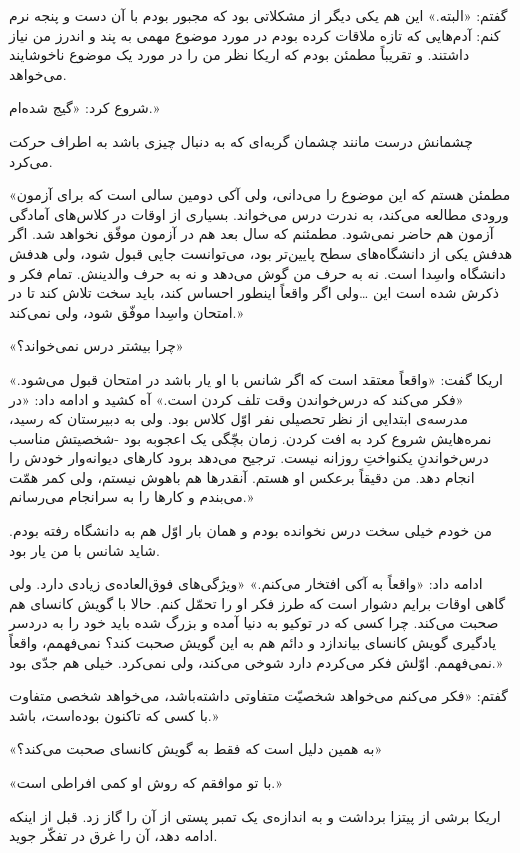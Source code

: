 \documentclass[a5paper]{book}
\begin{document}
گفتم: «البته.» این هم یکی دیگر از مشکلاتی بود که مجبور بودم با آن دست و پنجه نرم کنم: آدم‌هایی که تازه ملاقات کرده بودم در مورد موضوع مهمی به پند و اندرز من نیاز داشتند. و تقریباً مطمئن بودم که اریکا نظر من را در مورد یک موضوع ناخوشایند می‌خواهد.

شروع کرد: «گیج شده‌ام.»

چشمانش درست مانند چشمان گربه‌ای که به دنبال چیزی باشد به اطراف حرکت می‌کرد.

«مطمئن هستم که این موضوع را می‌دانی، ولی آکی دومین سالی است که برای آزمون ورودی مطالعه می‌کند، به ندرت درس می‌خواند. بسیاری از اوقات در کلاس‌های آمادگی آزمون هم حاضر نمی‌شود. مطمئنم که سال بعد هم در آزمون موفّق نخواهد شد. اگر هدفش یکی از دانشگاه‌های سطح پایین‌تر بود، می‌توانست جایی قبول شود، ولی هدفش دانشگاه واسِدا است. نه به حرف من گوش می‌دهد و نه به حرف والدینش. تمام فکر و ذکرش شده است این \ldots ولی اگر واقعاً اینطور احساس کند، باید سخت تلاش کند تا در امتحان واسِدا موفّق شود، ولی نمی‌کند.»

«چرا بیشتر درس نمی‌خواند؟»

اریکا گفت: «واقعاً معتقد است که اگر شانس با او یار باشد در امتحان قبول می‌شود.» «فکر می‌کند که درس‌خواندن وقت تلف کردن است.» آه کشید و ادامه داد: «در مدرسه‌ی ابتدایی از نظر تحصیلی نفر اوّل کلاس بود. ولی به دبیرستان که رسید، نمره‌هایش شروع کرد به افت کردن. زمان بچّگی یک اعجوبه بود -شخصیتش مناسب درس‌خواندنِ یکنواختِ روزانه نیست. ترجیح می‌دهد برود کارهای دیوانه‌وار خودش را انجام دهد. من دقیقاً برعکس او هستم. آنقدرها هم باهوش نیستم، ولی کمر همّت می‌بندم و کارها را به سرانجام می‌رسانم.»

من خودم خیلی سخت درس نخوانده بودم و همان بار اوّل هم به دانشگاه رفته بودم. شاید شانس با من یار بود.

ادامه داد: «واقعاً به آکی افتخار می‌کنم.» «ویژگی‌های فوق‌العاده‌ی زیادی دارد. ولی گاهی اوقات برایم دشوار است که طرز فکر او را تحمّل کنم. حالا با گویش کانسای هم صحبت می‌کند. چرا کسی که در توکیو به دنیا آمده و بزرگ شده باید خود را به دردسر یادگیری گویش کانسای بیاندازد و دائم هم به این گویش صحبت کند؟ نمی‌فهمم، واقعاً نمی‌فهمم. اوّلش فکر می‌کردم دارد شوخی می‌کند، ولی نمی‌کرد. خیلی هم جدّی بود.»

گفتم: «فکر می‌کنم می‌خواهد شخصیّت متفاوتی داشته‌باشد، می‌خواهد شخصی متفاوت با کسی که تاکنون بوده‌است، باشد.»

«به همین دلیل است که فقط به گویش کانسای صحبت می‌کند؟»

«با تو موافقم که روش او کمی افراطی است.»

اریکا برشی از پیتزا برداشت و به اندازه‌ی یک تمبر پستی از آن را گاز زد. قبل از اینکه ادامه دهد، آن را غرق در تفکّر جوید.
\end{document}

